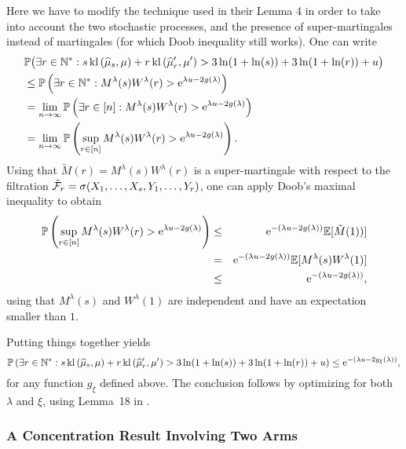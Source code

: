 Here we have to modify the technique used in their Lemma 4 in order to take into account the two stochastic processes, and the presence of super-martingales instead of martingales (for which Doob inequality still works).
One can write
%
\begin{align*}
    &\mathbb{P}\bigl( \exists r \in \mathbb{N}^* : s \, \mathrm{kl}\left(\widehat{\mu}_{s},\mu\right) + r \, \mathrm{kl}\left(\widehat{\mu}_r',\mu'\right) > 3\ln(1+\ln(s)) + 3\ln(1+\ln(r)) + u \bigr) \\
    & \leq \mathbb{P}\left(\exists r \in \mathbb{N}^* : M^\lambda(s)W^\lambda(r) > \mathrm{e}^{\lambda u - 2g(\lambda)}\right) \\
    & = \lim_{n \rightarrow \infty} \mathbb{P}\left(\exists r \in [n] :  M^\lambda(s)W^\lambda(r) > \mathrm{e}^{\lambda u - 2g(\lambda)}\right) \\
    & = \lim_{n \rightarrow \infty} \mathbb{P}\left(\sup_{r \in [n]}  M^\lambda(s)W^\lambda(r) > \mathrm{e}^{\lambda u - 2g(\lambda)}\right).
\end{align*}
%
Using that $\tilde{M}(r) = M^\lambda(s)W^\lambda(r)$ is a super-martingale with respect to the filtration $\tilde{\mathcal{F}}_r = \sigma(X_1,\dots,X_s, Y_1,\dots,Y_r)$, one can apply Doob's maximal inequality to obtain
\begin{eqnarray*}
    \mathbb{P}\left(\sup_{r \in [n]}  M^\lambda(s)W^\lambda(r) > \mathrm{e}^{\lambda u - 2g(\lambda)}\right) &\leq& \mathrm{e}^{-(\lambda u - 2g(\lambda))}\mathbb{E}[\tilde{M}(1))] \\
    & = & \mathrm{e}^{-(\lambda u - 2g(\lambda))}\mathbb{E}[M^\lambda(s)W^\lambda(1)] \\
    & \leq & \mathrm{e}^{-(\lambda u - 2g(\lambda))},
\end{eqnarray*}
using that $M^\lambda(s)$ and $W^\lambda(1)$ are independent and have an expectation smaller than $1$.

Putting things together yields
\[\mathbb{P}\left(\exists r \in \mathbb{N}^* : s \, \mathrm{kl}\left(\widehat{\mu}_{s},\mu\right) + r \, \mathrm{kl}\left(\widehat{\mu}_r',\mu'\right) > 3\ln(1+\ln(s)) + 3\ln(1+\ln(r)) + u\right) \leq \mathrm{e}^{-\left(\lambda u - 2g_{\xi}(\lambda)\right)},\]
for any function $g_{\xi}$ defined above.
%
The conclusion follows by optimizing for both $\lambda$ and $\xi$, using Lemma~18 in \cite{KK18Martingales}.


\subsubsection{A Concentration Result Involving Two Arms}\label{proof:6:Chernoff2arms}


